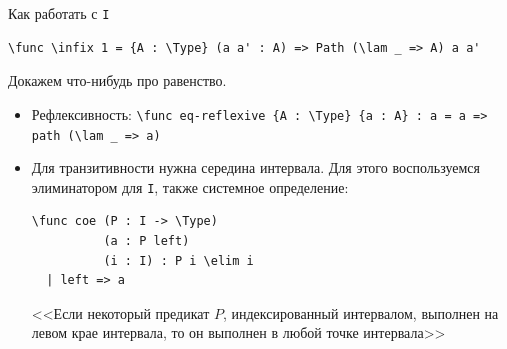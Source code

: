 \documentclass[aspectratio=169]{beamer}
\begin{document}
\begin{frame}[fragile]{Как работать с \texttt{I}}

\small\color[HTML]{025002}\begin{verbatim}
\func \infix 1 = {A : \Type} (a a' : A) => Path (\lam _ => A) a a'
\end{verbatim}\normalsize
\color{black}

Докажем что-нибудь про равенство.
\begin{itemize}
\item Рефлексивность: 
\small\color[HTML]{025002}\verb!\func eq-reflexive {A : \Type} {a : A} : a = a => path (\lam _ => a)!\normalsize\color{black}

\item Для транзитивности нужна середина интервала. Для этого воспользуемся 
элиминатором для \verb!I!, также системное определение:
\small\color[HTML]{025002}\begin{verbatim}
\func coe (P : I -> \Type)
          (a : P left)
          (i : I) : P i \elim i
  | left => a
\end{verbatim}\normalsize
\color{black}

<<Если некоторый предикат $P$, индексированный интервалом, выполнен на левом крае интервала, то он выполнен в любой точке интервала>>

\end{itemize}
\end{frame}
\end{document}
